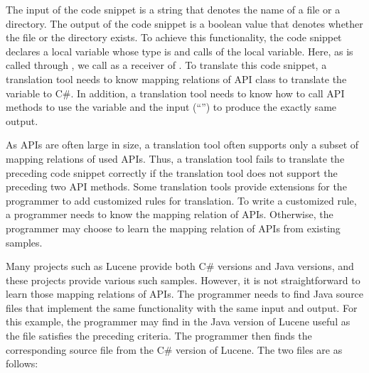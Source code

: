 The input of the code snippet is a string that denotes the name of a
file or a directory. The output of the code snippet is a boolean
value that denotes whether the file or the directory exists. To
achieve this functionality, the code snippet declares a local
variable whose type is  and calls
 of the local variable. Here, as 
is called through , we call  as a receiver
of . To translate this code snippet, a translation
tool needs to know mapping relations of API class to translate the
variable  to C\#. In addition, a translation tool needs
to know how to call API methods to use the variable and the input
(``'') to produce the exactly same output.

As APIs are often large in size, a translation tool often supports
only a subset of mapping relations of used APIs. Thus, a translation
tool fails to translate the preceding code snippet correctly if the
translation tool does not support the preceding two API methods.
Some translation tools provide extensions for the programmer to add
customized rules for translation. To write a customized rule, a
programmer needs to know the mapping relation of APIs. Otherwise,
the programmer may choose to learn the mapping relation of APIs from
existing samples.

Many projects such as Lucene provide both C\# versions and Java
versions, and these projects provide various such samples. However,
it is not straightforward to learn those mapping relations of APIs.
The programmer needs to find Java source files that implement the
same functionality with the same input and output. For this example,
the programmer may find  in the Java version
of Lucene useful as the file satisfies the preceding criteria. The
programmer then finds the corresponding source file
 from the C\# version of Lucene. The two files
are as follows:

